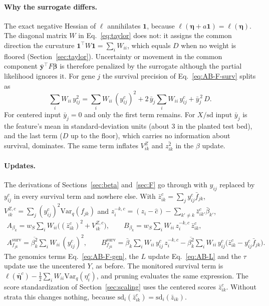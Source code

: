 \documentclass[11pt]{article}
\newcommand{\fbar}[2]{\bar{f}_{#1#2}}
\newcommand{\betabar}[1]{\bar{\beta}_{#1}}
\newcommand{\zsec}[2]{\overline{z^2_{#1#2}}}
\newcommand{\betasec}[1]{\overline{\beta^2_{#1}}}
\newcommand{\Var}{\mathrm{Var}_q}
\newcommand{\ws}{w_S}
\begin{document}
\paragraph{Why the surrogate differs.} The exact negative Hessian of $\ell$
annihilates $\bm 1$, because $\ell(\bm\eta + a\bm 1) = \ell(\bm\eta)$. The diagonal
matrix $W$ in Eq.~\eqref{eq:taylor} does not: it assigns the common direction the
curvature $\bm 1^\top W\bm 1 = \sum_i W_{ii}$, which equals $D$ when no weight is
floored (Section~\ref{sec:taylor}). Uncertainty or movement in
the common component $\bar{\bm y}^\top F\bm\beta$ is therefore penalized by the
surrogate although the partial likelihood ignores it. For gene $j$ the survival
precision of Eq.~\eqref{eq:AB-F-surv} splits as
\begin{equation}\label{eq:center-split}
  \sum_i W_{ii}\,y_{ij}^2
  = \sum_i W_{ii}\,(y^c_{ij})^2 + 2\,\bar y_j\sum_i W_{ii}\,y^c_{ij} + \bar y_j^{\,2}\,D .
\end{equation}
For centered input $\bar y_j = 0$ and only the first term remains. For $X/\mathrm{sd}$
input $\bar y_j$ is the feature's mean in standard-deviation units (about 3 in
the planted test bed), and the last term ($D$ up to the floor), which carries no information
about survival, dominates. The same term inflates $V^Z_{ik}$ and $\zsec{i}{k}$ in the
$\beta$ update.

\paragraph{Updates.} The derivations of Sections~\ref{sec:beta} and~\ref{sec:F}
go through with $y_{ij}$ replaced by $y^c_{ij}$ in every survival term and
nowhere else. With
$\bar z^c_{ik} = \sum_j y^c_{ij}\fbar{j}{k}$,
$V^{Z,c}_{ik} = \sum_j (y^c_{ij})^2\Var(f_{jk})$ and
$z^{-k,c}_i = (z_i - \hat c) - \sum_{k'\ne k}\bar z^c_{ik'}\betabar{k'}$,
\begin{gather}
  A_{\beta_k} = \ws\sum_i W_{ii}\bigl((\bar z^c_{ik})^2 + V^{Z,c}_{ik}\bigr), \qquad
  B_{\beta_k} = \ws\sum_i W_{ii}\,z^{-k,c}_i\,\bar z^c_{ik}, \label{eq:center-AB-beta}\\
  A^{\text{surv}}_{f_{jk}} = \betasec{k}\sum_i W_{ii}\,(y^c_{ij})^2, \qquad
  B^{\text{surv}}_{f_{jk}} = \betabar{k}\sum_i W_{ii}\,y^c_{ij}\,z^{-k,c}_i
   - \betasec{k}\sum_i W_{ii}\,y^c_{ij}\bigl(\bar z^c_{ik} - y^c_{ij}\fbar{j}{k}\bigr).
   \label{eq:center-AB-F}
\end{gather}
The genomics terms Eq.~\eqref{eq:AB-F-gen}, the $L$ update Eq.~\eqref{eq:AB-L} and
the $\tau$ update use the uncentered $Y$, as before. The monitored survival term
is $\ell(\bar{\bm\eta}^c) - \tfrac12\sum_i W_{ii}\Var(\eta^c_i)$, and pruning
evaluates the same expression. The score standardization of
Section~\ref{sec:scaling} uses the centered scores $\bar z^c_{ik}$. Without strata
this changes nothing, because
$\mathrm{sd}_i(\bar z^c_{ik}) = \mathrm{sd}_i(\bar z_{ik})$.
\end{document}
